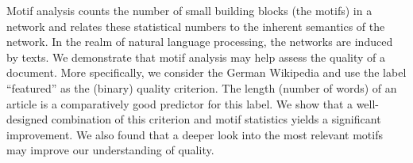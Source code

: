 Motif analysis counts the number of small building blocks (the motifs) in a network and relates these statistical numbers to the inherent semantics of the network. In the realm of natural language processing, the networks are induced by texts. We demonstrate that motif analysis may help assess the quality of a document. More specifically, we consider the German Wikipedia and use the label ``featured'' as the (binary) quality criterion. The length (number of words) of an article is a comparatively good predictor for this label. We show that a well-designed combination of this criterion and motif statistics yields a significant improvement. We also found that a deeper look into the most relevant motifs may improve our understanding of quality.

